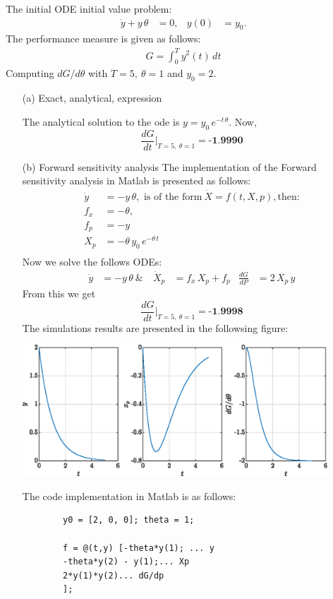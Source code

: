 The initial ODE initial value problem:
\begin{align*}
	\dot y + y\,\theta &= 0, & y(0) &= y_0.	
\end{align*}
The  performance measure is given as follows:
\begin{align*}
	G = \int_{0}^{T}y^2(t)\,dt
\end{align*}
Computing $dG/d\theta$ with $T = 5,\ \theta=1$ and $y_0 = 2$.
\begin{enumerate}
	\item[(a)] Exact, analytical, expression
	
	The analytical solution to the ode is $y = y_0\,e^{-t\,\theta}$.
	Now, $$\frac{dG}{dt}\Bigg|_{T = 5,\ \theta = 1} = \textbf{-1.9990}$$
	\item[(b)] Forward sensitivity analysis
	The implementation of the Forward sensitivity analysis in Matlab is presented as follows:
	\begin{align*}
		\dot y & = -y\,\theta, \text{ is of the form}\ \dot X = f(t,X,p), \text{then:} \\
		f_x &= -\theta, \\
		f_p &= -y \\
		X_p &= -\theta\,y_0\,e^{-\theta\,t} \\
	\end{align*}
	Now we solve the follows ODEs:
	\begin{align*}
		\dot y & = -y\,\theta\ \& &\  \dot X_p &= f_x\,X_p + f_p & \frac{dG}{dP} &= 2\,X_p\,y
	\end{align*}
	From this we get $$\frac{dG}{dt}\Bigg|_{T = 5,\ \theta = 1} = \textbf{-1.9998}$$
	The simulations results are presented in the followsing figure:
	
	\includegraphics[width=0.9\textwidth]{Figures/Ugf21b.eps}
	
	The code implementation in Matlab is as follows:
	\begin{lstlisting}
		y0 = [2, 0, 0]; theta = 1;
		
		f = @(t,y) [-theta*y(1); ... y
		-theta*y(2) - y(1);... Xp
		2*y(1)*y(2)... dG/dp
		]; 
		

\end{lstlisting}
\end{enumerate}
